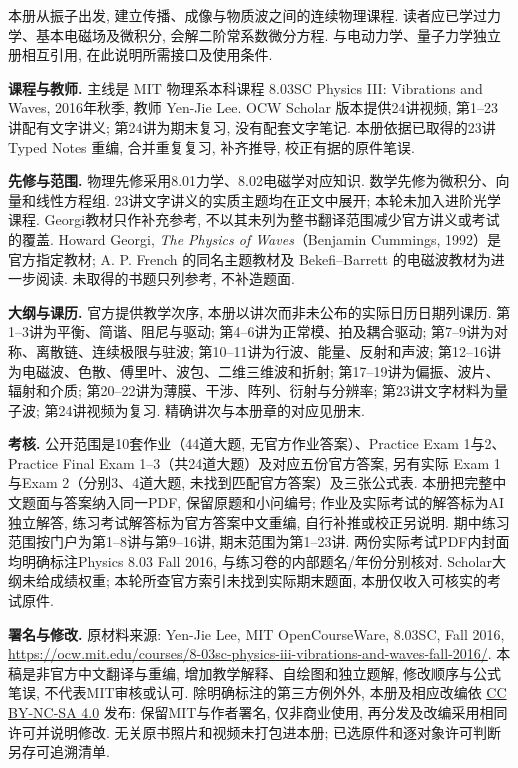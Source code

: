 \originalpreface
本册从振子出发, 建立传播、成像与物质波之间的连续物理课程. 读者应已学过力学、基本电磁场及微积分, 会解二阶常系数微分方程. 与电动力学、量子力学独立册相互引用, 在此说明所需接口及使用条件.

\textbf{课程与教师.} 主线是 MIT 物理系本科课程 8.03SC Physics III: Vibrations and Waves, 2016年秋季, 教师 Yen-Jie Lee. OCW Scholar 版本提供24讲视频, 第1--23讲配有文字讲义; 第24讲为期末复习, 没有配套文字笔记. 本册依据已取得的23讲 Typed Notes 重编, 合并重复复习, 补齐推导, 校正有据的原件笔误.

\textbf{先修与范围.} 物理先修采用8.01力学、8.02电磁学对应知识. 数学先修为微积分、向量和线性方程组. 23讲文字讲义的实质主题均在正文中展开; 本轮未加入进阶光学课程. Georgi教材只作补充参考, 不以其未列为整书翻译范围减少官方讲义或考试的覆盖. Howard Georgi, \emph{The Physics of Waves}（Benjamin Cummings, 1992）是官方指定教材; A. P. French 的同名主题教材及 Bekefi--Barrett 的电磁波教材为进一步阅读. 未取得的书题只列参考, 不补造题面.

\textbf{大纲与课历.} 官方提供教学次序, 本册以讲次而非未公布的实际日历日期列课历. 第1--3讲为平衡、简谐、阻尼与驱动; 第4--6讲为正常模、拍及耦合驱动; 第7--9讲为对称、离散链、连续极限与驻波; 第10--11讲为行波、能量、反射和声波; 第12--16讲为电磁波、色散、傅里叶、波包、二维三维波和折射; 第17--19讲为偏振、波片、辐射和介质; 第20--22讲为薄膜、干涉、阵列、衍射与分辨率; 第23讲文字材料为量子波; 第24讲视频为复习. 精确讲次与本册章的对应见册末.

\textbf{考核.} 公开范围是10套作业（44道大题, 无官方作业答案）、Practice Exam 1与2、Practice Final Exam 1--3（共24道大题）及对应五份官方答案, 另有实际 Exam 1与Exam 2（分别3、4道大题, 未找到匹配官方答案）及三张公式表. 本册把完整中文题面与答案纳入同一PDF, 保留原题和小问编号; 作业及实际考试的解答标为AI独立解答, 练习考试解答标为官方答案中文重编, 自行补推或校正另说明. 期中练习范围按门户为第1--8讲与第9--16讲, 期末范围为第1--23讲. 两份实际考试PDF内封面均明确标注Physics 8.03 Fall 2016, 与练习卷的内部题名/年份分别核对. Scholar大纲未给成绩权重; 本轮所查官方索引未找到实际期末题面, 本册仅收入可核实的考试原件.

\textbf{署名与修改.} 原材料来源: Yen-Jie Lee, MIT OpenCourseWare, 8.03SC, Fall 2016, \url{https://ocw.mit.edu/courses/8-03sc-physics-iii-vibrations-and-waves-fall-2016/}. 本稿是非官方中文翻译与重编, 增加教学解释、自绘图和独立题解, 修改顺序与公式笔误, 不代表MIT审核或认可. 除明确标注的第三方例外外, 本册及相应改编依 \href{https://creativecommons.org/licenses/by-nc-sa/4.0/}{CC BY-NC-SA 4.0} 发布: 保留MIT与作者署名, 仅非商业使用, 再分发及改编采用相同许可并说明修改. 无关原书照片和视频未打包进本册; 已选原件和逐对象许可判断另存可追溯清单.
